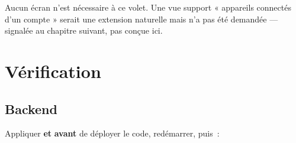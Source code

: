 \begin{note}
Aucun écran  n'est nécessaire à ce volet. Une vue support « appareils
connectés d'un compte » serait une extension naturelle mais n'a pas été demandée --- signalée
au chapitre suivant, pas conçue ici.
\end{note}

\chapter{Vérification}

\section{Backend}

Appliquer  \textbf{et} 
\textbf{avant} de déployer le code, redémarrer, puis~:

